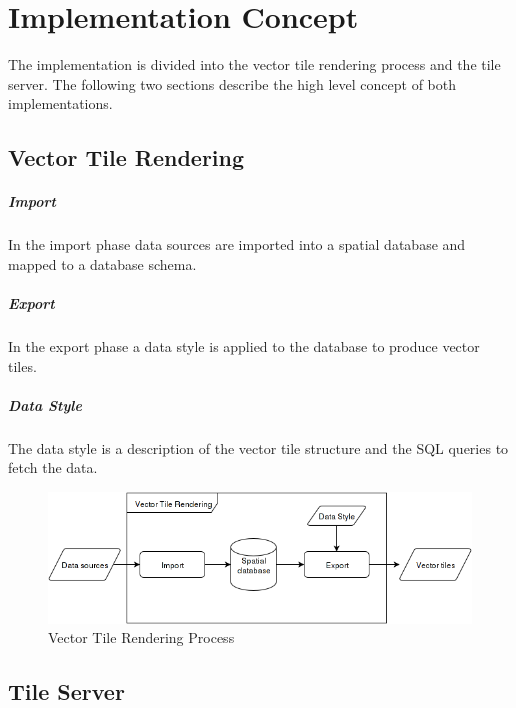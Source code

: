 \chapter{Implementation Concept}\label{implementation_concept}

The implementation is divided into the vector tile rendering process and the tile server. The following two sections describe the high level concept of both implementations.

\section{Vector Tile Rendering}

\paragraph{Import}
In the import phase data sources are imported into a spatial database and mapped to a database schema.

\paragraph{Export}
In the export phase a data style is applied to the database to produce vector tiles.

\paragraph{Data Style}
The data style is a description of the vector tile structure and the SQL queries to fetch the data.

\begin{figure}[h]
  \centering
  \includegraphics[scale=0.6]{images/vector_tile_rendering_squashed.png}
  \caption{Vector Tile Rendering Process}
\end{figure}

\section{Tile Server}


